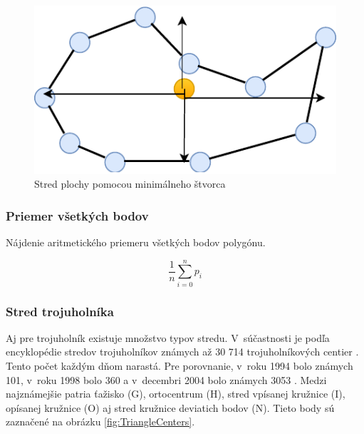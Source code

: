 \begin{figure}[H]
	\centering
	\includegraphics[height=0.3\textwidth]{obrazky-figures/Diagram/Draw/1Points/DP Navrh operacii-0D - PointMiddle of surface.pdf}
	\caption{Stred plochy pomocou minimálneho štvorca }
	\label{fig:PointMiddleofsurface}
\end{figure}



\subsubsection{Priemer všetkých bodov}
Nájdenie aritmetického priemeru všetkých bodov polygónu.

\begin{equation}
    \frac{1}{n} \sum_{i=0}^{n} p_i   
    \label{eq:aritPriemer}
\end{equation}


\subsubsection{Stred trojuholníka}
Aj pre trojuholník existuje množstvo typov stredu. V~súčastnosti je podľa encyklopédie stredov trojuholníkov známych až 30 714 trojuholníkových centier \cite{kimberling_2019}. Tento počet každým dňom narastá. Pre porovnanie, v~roku 1994 bolo známych 101, v~roku 1998 bolo 360 a v~decembri 2004 bolo známych 3053 \cite{Kimberling_Center_2004}. Medzi najznámejšie patria ťažisko (G), ortocentrum (H), stred vpísanej kružnice (I), opísanej kružnice (O) aj stred kružnice deviatich bodov (N). Tieto body sú zaznačené na obrázku \ref{fig:TriangleCenters}.


